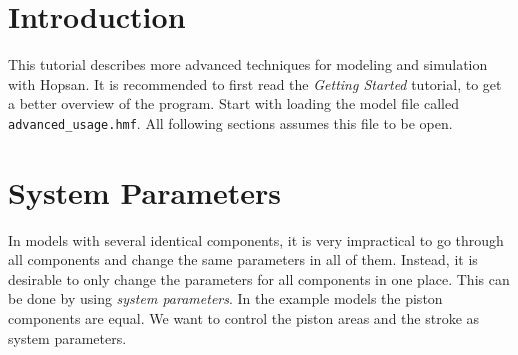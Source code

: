 \documentclass[a4paper,pdftex]{article}
\begin{document}

\section*{Introduction}
This tutorial describes more advanced techniques for modeling and simulation with Hopsan. It is recommended to first read the \textit{Getting Started} tutorial, to get a better overview of the program. Start with loading the model file called \texttt{advanced\_usage.hmf}. All following sections assumes this file to be open.


\section{System Parameters}
In models with several identical components, it is very impractical to go through all components and change the same parameters in all of them.
Instead, it is desirable to only change the parameters for all components in one place. 
This can be done by using \textit{system parameters}. 
In the example models the piston components are equal.
We want to control the piston areas and the stroke as system parameters.
\end{document}
